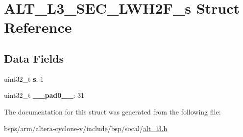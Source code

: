 \hypertarget{structALT__L3__SEC__LWH2F__s}{}\section{A\+L\+T\+\_\+\+L3\+\_\+\+S\+E\+C\+\_\+\+L\+W\+H2\+F\+\_\+s Struct Reference}
\label{structALT__L3__SEC__LWH2F__s}
\subsection*{Data Fields}
\begin{DoxyCompactItemize}
\item 
\mbox{\label{structALT__L3__SEC__LWH2F__s_a20e0d4fdf9d9130dc6dec5292c0c23f1}} 
uint32\+\_\+t {\bfseries s}\+: 1
\item 
\mbox{\label{structALT__L3__SEC__LWH2F__s_a4869444270ed0ee790cb0b9e7a44c18a}} 
uint32\+\_\+t {\bfseries \+\_\+\+\_\+pad0\+\_\+\+\_\+}\+: 31
\end{DoxyCompactItemize}


The documentation for this struct was generated from the following file\+:\begin{DoxyCompactItemize}
\item 
bsps/arm/altera-\/cyclone-\/v/include/bsp/socal/\mbox{\hyperlink{alt__l3_8h}{alt\+\_\+l3.\+h}}\end{DoxyCompactItemize}
